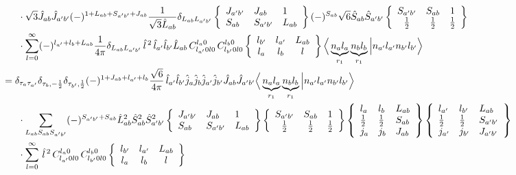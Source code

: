 \documentclass[master]{shnuthesis}
\newcommand{\ap}{a^\prime}
\newcommand{\bp}{b^\prime}
\newcommand{\il}{\!\!\!\!\!\!\!\!\!\!}
\begin{document}
\begin{align}
    & \cdot \sqrt{3}\hat{J}_{ab}\hat{J}_{\ap\bp}(-)^{1+L_{ab}+S_{\ap\bp}+J_{ab}}\frac{1}{\sqrt{3}\hat{L}_{ab}}\delta_{L_{ab}L_{\ap\bp}}  \left\{\begin{array}{lll} J_{\ap\bp} & J_{ab} & 1 \\ S_{ab} & S_{\ap\bp} & L_{ab} \end{array}\right\}  (-)^{S_{ab}}\sqrt{6}\hat{S}_{ab}\hat{S}_{\ap\bp}  \left\{\begin{array}{ccc} S_{\ap\bp} & S_{ab} & 1 \\ \frac{1}{2} & \frac{1}{2} & \frac{1}{2} \end{array}\right\}\notag\\
    & \cdot \sum_{l=0}^\infty (-)^{l_{\ap}+l_b+L_{ab}}\frac{1}{4\pi}\delta_{L_{ab}L_{\ap\bp}}\,\hat{l}^{\,2}\,\hat{l}_{\ap}\hat{l}_{\bp}\hat{L}_{ab}\,C_{l_{\ap} 0 l 0}^{l_a 0} \,C_{l_{\bp} 0 l 0}^{l_b 0}  \left\{\begin{array}{ccc} l_{\bp} & l_{\ap} & L_{ab} \\ l_a & l_b & l \end{array}\right\}  \Big\langle \underbrace{n_a l_a}_{r_1} \underbrace{n_b l_b}_{r_1} \Big| n_{\ap} l_{\ap} n_{\bp} l_{\bp} \Big\rangle \\
    &\il = \delta_{\tau_a \tau_{\ap}}\delta_{\tau_b, -\frac{1}{2}}\delta_{\tau_{\bp}, \frac{1}{2}} (-)^{1+J_{ab}+l_{\ap}+l_b}\frac{\sqrt{6}}{4\pi}\,\hat{l}_{\ap}\hat{l}_{\bp}\hat{j}_a\hat{j}_b\hat{j}_{\ap}\hat{j}_{\bp}\hat{J}_{ab}\hat{J}_{\ap\bp} \Big\langle \underbrace{n_a l_a}_{r_1} \underbrace{n_b l_b}_{r_1} \Big| n_{\ap} l_{\ap} n_{\bp} l_{\bp} \Big\rangle \notag \\
    & \cdot \sum_{L_{ab}S_{ab}S_{\ap\bp}} (-)^{S_{\ap\bp}+S_{ab}}\hat{L}_{ab}^2\hat{S}_{ab}^2\hat{S}_{\ap\bp}^2  \left\{\begin{array}{lll} J_{\ap\bp} & J_{ab} & 1 \\ S_{ab} & S_{\ap\bp} & L_{ab} \end{array}\right\}    \left\{\begin{array}{ccc} S_{\ap\bp} & S_{ab} & 1 \\ \frac{1}{2} & \frac{1}{2} & \frac{1}{2} \end{array}\right\}  \left\{\begin{array}{lll}l_{a} & l_{b} & L_{ab} \\ \frac{1}{2} & \frac{1}{2} & S_{ab} \\j_{a} & j_{b} & J_{ab} \end{array}\right\}  \left\{\begin{array}{lll}l_{\ap} & l_{\bp} & L_{ab} \\ \frac{1}{2} & \frac{1}{2} & S_{\ap\bp} \\j_{\ap} & j_{\bp} & J_{\ap\bp} \end{array}\right\}  \notag\\
    & \cdot \sum_{l=0}^\infty \,\hat{l}^{\,2}\,C_{l_{\ap} 0 l 0}^{l_a 0} \,C_{l_{\bp} 0 l 0}^{l_b 0}  \left\{\begin{array}{ccc} l_{\bp} & l_{\ap} & L_{ab} \\ l_a & l_b & l \end{array}\right\}
\end{align}
\end{document}
